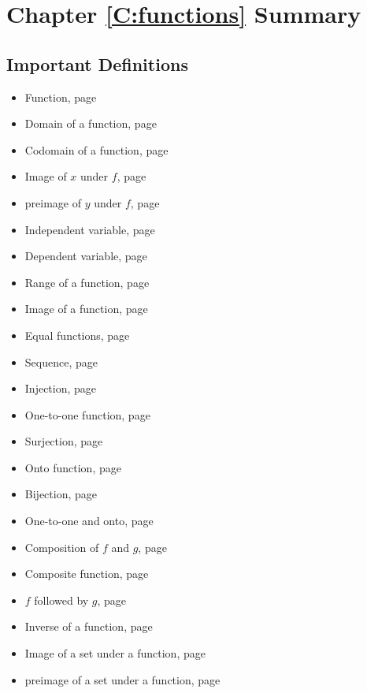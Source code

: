 \section{Chapter \ref{C:functions} Summary}

\subsection*{Important Definitions}
\begin{multicols}{2}
\begin{itemize}
\item Function, page~\pageref*{function}
\item Domain of a function, page~\pageref*{domainfunction}
\item Codomain of a function, page~\pageref*{domainfunction}
\item Image of $x$ under $f$, page~\pageref*{domainfunction}
\item preimage of $y$ under $f$, page~\pageref*{domainfunction}
\item Independent variable, page~\pageref*{domainfunction}
\item Dependent variable, page~\pageref*{domainfunction}
\item Range of a function, page~\pageref*{rangeandimage}
\item Image of a function, page~\pageref*{rangeandimage}
\item Equal functions, page~\pageref*{functionequality}
\item Sequence, page~\pageref*{sequence}
\item Injection, page~\pageref*{injection}
\item One-to-one function, page~\pageref*{injection}
\item Surjection, page~\pageref*{surjection}
\item Onto function, page~\pageref*{surjection}
\item Bijection, page~\pageref*{bijection}
\item One-to-one and onto, page~\pageref*{bijection}
\item Composition of $f$ and $g$, page~\pageref*{functioncomposition}
\item Composite function, page~\pageref*{functioncomposition}
\item $f$ followed by $g$, page~\pageref*{functioncomposition}
\item Inverse of a function, page~\pageref*{inversefunction}
\item Image of a set under a function, page~\pageref*{imageofA}
\item preimage of a set under a function, page~\pageref*{inverseimage}
\end{itemize}
\end{multicols}



